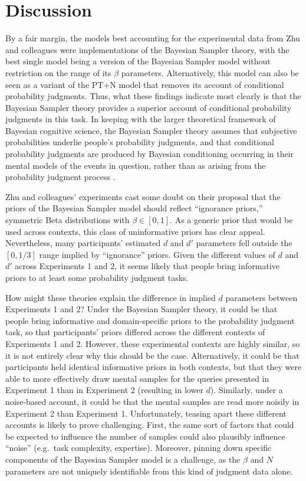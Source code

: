 \documentclass[
  man,floatsintext]{apa6}
\begin{document}
\hypertarget{discussion}{%
\section{Discussion}\label{discussion}}

By a fair margin, the models best accounting for the experimental data from Zhu and colleagues \autocite*{zhu.etal2020} were implementations of the Bayesian Sampler theory, with the best single model being a version of the Bayesian Sampler model without restriction on the range of its \(\beta\) parameters. Alternatively, this model can also be seen as a variant of the PT+N model that removes its account of conditional probability judgments. Thus, what these findings indicate most clearly is that the Bayesian Sampler theory provides a superior account of conditional probability judgments in this task. In keeping with the larger theoretical framework of Bayesian cognitive science, the Bayesian Sampler theory assumes that subjective probabilities underlie people's probability judgments, and that conditional probability judgments are produced by Bayesian conditioning occurring in their mental models of the events in question, rather than as arising from the probability judgment process \autocite{chater.etal2020,zhu.etal2020}.

Zhu and colleagues' experiments cast some doubt on their proposal that the priors of the Bayesian Sampler model should reflect ``ignorance priors,'' symmetric Beta distributions with \(\beta \in [0, 1]\). As a generic prior that would be used across contexts, this class of uninformative priors has clear appeal. Nevertheless, many participants' estimated \(d\) and \(d'\) parameters fell outside the \([0, 1/3]\) range implied by ``ignorance'' priors. Given the different values of \(d\) and \(d'\) across Experiments 1 and 2, it seems likely that people bring informative priors to at least some probability judgment tasks.

How might these theories explain the difference in implied \(d\) parameters between Experiments 1 and 2? Under the Bayesian Sampler theory, it could be that people bring informative and domain-specific priors to the probability judgment task, so that participants' priors differed across the different contexts of Experiments 1 and 2. However, these experimental contexts are highly similar, so it is not entirely clear why this should be the case. Alternatively, it could be that participants held identical informative priors in both contexts, but that they were able to more effectively draw mental samples for the queries presented in Experiment 1 than in Experiment 2 (resulting in lower \(d\)). Similarly, under a noise-based account, it could be that the mental samples are read more noisily in Experiment 2 than Experiment 1. Unfortunately, teasing apart these different accounts is likely to prove challenging. First, the same sort of factors that could be expected to influence the number of samples could also plausibly influence ``noise'' (e.g.~task complexity, expertise). Moreover, pinning down specific components of the Bayesian Sampler model is a challenge, as the \(\beta\) and \(N\) parameters are not uniquely identifiable from this kind of judgment data alone.
\end{document}
